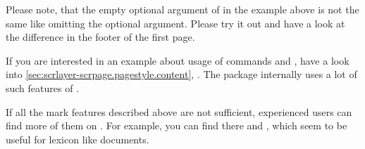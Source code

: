 Please note, that the empty optional argument of
 in the example above is not the same like omitting the optional
argument. Please try it out and have a look at the difference in the footer of
the first page.%
\else %
  \par %
  If you are interested in an example about usage of commands 
  and , have a look into
  \autoref{sec:scrlayer-scrpage.pagestyle.content},
  . The package
   internally uses a lot of such features of
  .%
\fi%
\ifnum{}\else\par
  If all the mark features described above are not sufficient, experienced
  users can find more of them on %
  . For example, you can find
  there  and , which seem to be
  useful for lexicon like documents.%
\fi
{}%
%
%
%

